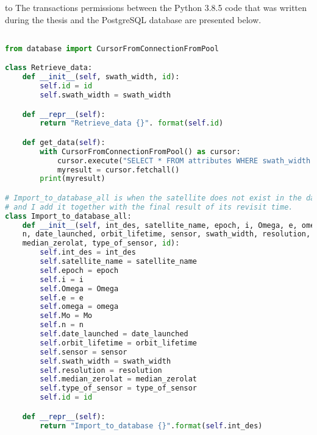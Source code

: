 \documentclass[12pt,a4paper,notitlepage,oneside,openright]{report}
\begin{document}
\def\dashfill{\cleaders\hbox{-}\hfill}
\hbox to \hsize{\dashfill\hfil}
The transactions permissions between the Python 3.8.5 code that was written during the thesis and the PostgreSQL database are presented below.
\begin{center}
\begin{lstlisting}[language=Python, formfeed=\newpage, extendedchars=true]

from database import CursorFromConnectionFromPool

class Retrieve_data:
    def __init__(self, swath_width, id):
        self.id = id
        self.swath_width = swath_width

    def __repr__(self):
        return "Retrieve_data {}". format(self.id)

    def get_data(self):
        with CursorFromConnectionFromPool() as cursor:
            cursor.execute("SELECT * FROM attributes WHERE swath_width = %s;", (self.swath_width,))
            myresult = cursor.fetchall()
        print(myresult)

# Import_to_database_all is when the satellite does not exist in the database
# and I add it together with the final result of its revisit time.
class Import_to_database_all:
    def __init__(self, int_des, satellite_name, epoch, i, Omega, e, omega, Mo,
    n, date_launched, orbit_lifetime, sensor, swath_width, resolution,
    median_zerolat, type_of_sensor, id):
        self.int_des = int_des
        self.satellite_name = satellite_name
        self.epoch = epoch
        self.i = i
        self.Omega = Omega
        self.e = e
        self.omega = omega
        self.Mo = Mo
        self.n = n
        self.date_launched = date_launched
        self.orbit_lifetime = orbit_lifetime
        self.sensor = sensor
        self.swath_width = swath_width
        self.resolution = resolution
        self.median_zerolat = median_zerolat
        self.type_of_sensor = type_of_sensor
        self.id = id

    def __repr__(self):
        return "Import_to_database {}".format(self.int_des)


\end{lstlisting}
\end{center}
\end{document}
